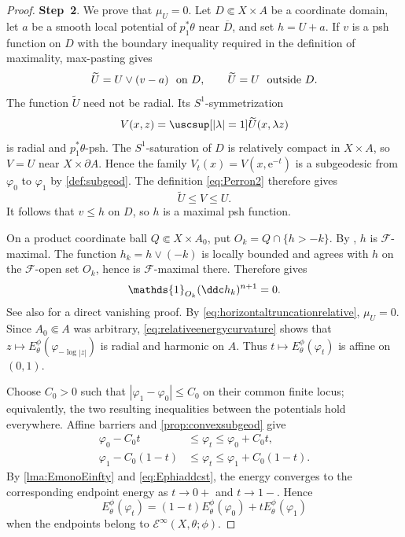 \begin{proof}
    \textbf{Step~2}. We prove that $\mu_U=0$. Let $D\Subset X\times A$ be a coordinate domain, let $a$ be a smooth local potential of $p_1^*\theta$ near $\overline D$, and set $h=U+a$. If $v$ is a psh function on $D$ with the boundary inequality required in the definition of maximality, max-pasting gives
    \[
        \widetilde U=U\lor(v-a)\ \textup{ on }D,
        \qquad \widetilde U=U\ \textup{ outside }D.
    \]
    The function $\widetilde U$ need not be radial. Its $S^1$-symmetrization
    \[
        V(x,z)=\uscsup[|\lambda|=1]\widetilde U(x,\lambda z)
    \]
    is radial and $p_1^*\theta$-psh. The $S^1$-saturation of $D$ is relatively compact in $X\times A$, so $V=U$ near $X\times\partial A$. Hence the family $V_t(x)=V(x,\mathrm{e}^{-t})$ is a subgeodesic from $\varphi_0$ to $\varphi_1$ by \cref{def:subgeod}. The definition \eqref{eq:Perron2} therefore gives
    \[
        \widetilde U\leq V\leq U.
    \]
    It follows that $v\leq h$ on $D$, so $h$ is a maximal psh function.

    On a product coordinate ball $Q\Subset X\times A_0$, put $O_k=Q\cap\{h>-k\}$. By \cite[Proposition~5.9.3]{EKF}, $h$ is $\mathcal F$-maximal. The function $h_k=h\lor(-k)$ is locally bounded and agrees with $h$ on the $\mathcal F$-open set $O_k$, hence is $\mathcal F$-maximal there. Therefore \cite[Theorem~5.10.1]{EKF} gives
    \[
        \mathds{1}_{O_k}(\ddc h_k)^{n+1}=0.
    \]
    See also \cite[Lemma~17.7.1]{FPT} for a direct vanishing proof. By \eqref{eq:horizontaltruncationrelative}, $\mu_U=0$. Since $A_0\Subset A$ was arbitrary, \eqref{eq:relativeenergycurvature} shows that $z\mapsto E_\theta^\phi(\varphi_{-\log|z|})$ is radial and harmonic on $A$. Thus $t\mapsto E_\theta^\phi(\varphi_t)$ is affine on $(0,1)$.

    Choose $C_0>0$ such that $|\varphi_1-\varphi_0|\leq C_0$ on their common finite locus; equivalently, the two resulting inequalities between the potentials hold everywhere. Affine barriers and \cref{prop:convexsubgeod} give
    \[
        \begin{aligned}
        \varphi_0-C_0t&\leq\varphi_t\leq\varphi_0+C_0t,\\
        \varphi_1-C_0(1-t)&\leq\varphi_t\leq\varphi_1+C_0(1-t).
        \end{aligned}
    \]
    By \cref{lma:EmonoEinfty} and \eqref{eq:Ephiaddcst}, the energy converges to the corresponding endpoint energy as $t\to0+$ and $t\to1-$. Hence
    \begin{equation}\label{eq:relativeenergylinearbounded}
        E_\theta^\phi(\varphi_t)
        =(1-t)E_\theta^\phi(\varphi_0)+tE_\theta^\phi(\varphi_1)
    \end{equation}
    when the endpoints belong to $\mathcal E^\infty(X,\theta;\phi)$.


\end{proof}
